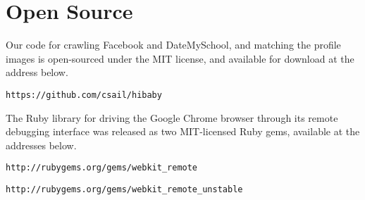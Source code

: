 \section{Open Source}

Our code for crawling Facebook and DateMySchool, and matching the profile
images is open-sourced under the MIT license, and available for download at the
address below.

\texttt{https://github.com/csail/hibaby}

The Ruby library for driving the Google Chrome browser through its remote
debugging interface was released as two MIT-licensed Ruby gems, available at
the addresses below.

\texttt{http://rubygems.org/gems/webkit\_remote}

\texttt{http://rubygems.org/gems/webkit\_remote\_unstable}
